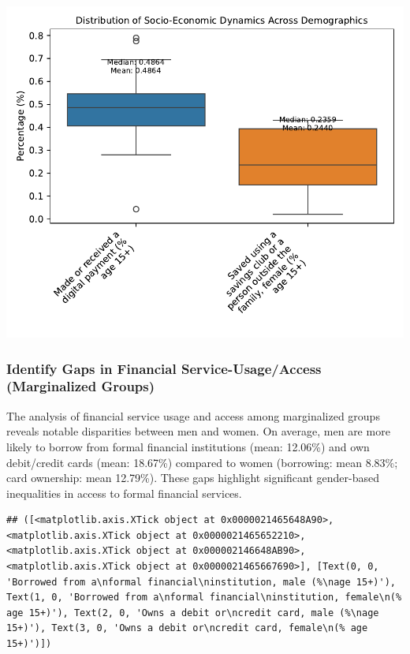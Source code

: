 \documentclass[preprint, 3p,
authoryear]{elsarticle} %
\begin{document}
\begin{center}\includegraphics[width=0.9\linewidth]{Final-Report_files/figure-latex/unnamed-chunk-23-17} \end{center}

\subsubsection{Identify Gaps in Financial Service-Usage/Access
(Marginalized
Groups)}\label{identify-gaps-in-financial-service-usageaccess-marginalized-groups}

The analysis of financial service usage and access among marginalized
groups reveals notable disparities between men and women. On average,
men are more likely to borrow from formal financial institutions (mean:
12.06\%) and own debit/credit cards (mean: 18.67\%) compared to women
(borrowing: mean 8.83\%; card ownership: mean 12.79\%). These gaps
highlight significant gender-based inequalities in access to formal
financial services.

\begin{verbatim}
## ([<matplotlib.axis.XTick object at 0x0000021465648A90>, <matplotlib.axis.XTick object at 0x0000021465652210>, <matplotlib.axis.XTick object at 0x000002146648AB90>, <matplotlib.axis.XTick object at 0x0000021465667690>], [Text(0, 0, 'Borrowed from a\nformal financial\ninstitution, male (%\nage 15+)'), Text(1, 0, 'Borrowed from a\nformal financial\ninstitution, female\n(% age 15+)'), Text(2, 0, 'Owns a debit or\ncredit card, male (%\nage 15+)'), Text(3, 0, 'Owns a debit or\ncredit card, female\n(% age 15+)')])
\end{verbatim}
\end{document}
